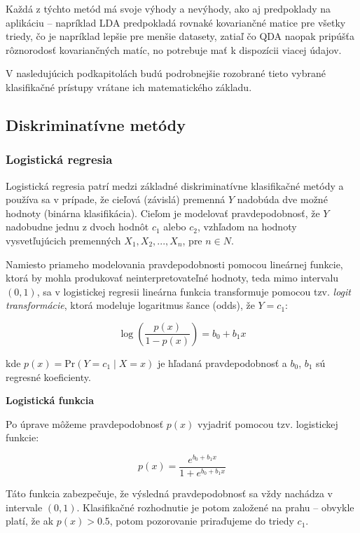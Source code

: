 Každá z týchto metód má svoje výhody a nevýhody, ako aj predpoklady na aplikáciu – napríklad LDA predpokladá rovnaké kovariančné matice pre všetky triedy, čo je napríklad lepšie pre menšie datasety, zatiaľ čo QDA naopak pripúšťa rôznorodosť kovariančných matíc, no potrebuje mať k dispozícii viacej údajov.

V nasledujúcich podkapitolách budú podrobnejšie rozobrané tieto vybrané klasifikačné prístupy vrátane ich matematického základu.

\subsection{Diskriminatívne metódy}
\label{subsec:disc_methods}

\subsubsection{Logistická regresia}
\label{subsubsec:log_regression}

Logistická regresia patrí medzi základné diskriminatívne klasifikačné metódy a používa sa v prípade, že cieľová (závislá) premenná $Y$ nadobúda dve možné hodnoty (binárna klasifikácia). Cieľom je modelovať pravdepodobnosť, že $Y$ nadobudne jednu z dvoch hodnôt $c_1$ alebo $c_2$, vzhľadom na hodnoty vysvetľujúcich premenných $X_1, X_2, ..., X_n$, pre $n \in N$.

Namiesto priameho modelovania pravdepodobnosti pomocou lineárnej funkcie, ktorá by mohla produkovať neinterpretovateľné hodnoty, teda mimo intervalu $(0,1)$, sa v logistickej regresii lineárna funkcia transformuje pomocou tzv. \textit{logit transformácie}, ktorá modeluje logaritmus šance (odds), že $Y = c_1$:

\begin{equation}
\log\left( \frac{p(x)}{1 - p(x)} \right) = b_0 + b_1 x
\end{equation}

kde $p(x) = \mathrm{Pr}(Y=c_1\mid X=x)$ je hľadaná pravdepodobnosť a $b_0$, $b_1$ sú regresné koeficienty.

\textbf{Logistická funkcia}

Po úprave môžeme pravdepodobnosť $p(x)$ vyjadriť pomocou tzv. logistickej funkcie:

\begin{equation}
p(x) = \frac{e^{b_0 + b_1 x}}{1 + e^{b_0 + b_1 x}}
\end{equation}

Táto funkcia zabezpečuje, že výsledná pravdepodobnosť sa vždy nachádza v intervale $(0,1)$. Klasifikačné rozhodnutie je potom založené na prahu – obvykle platí, že ak $p(x) > 0.5$, potom pozorovanie priraďujeme do triedy $c_1$.

